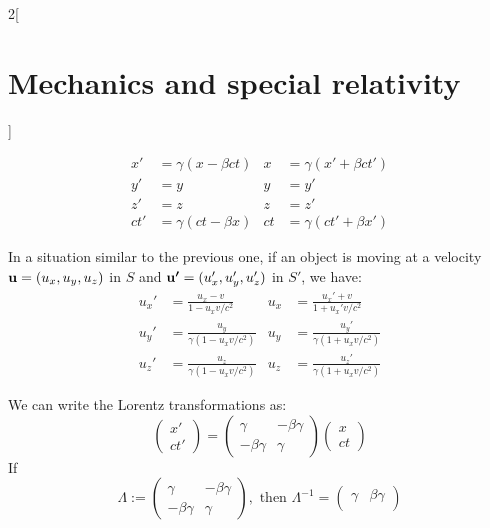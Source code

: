 \documentclass[../../../main.tex]{subfiles}
\begin{document}
\begin{multicols}{2}[\section{Mechanics and special relativity}]
\begin{prop}
\begin{align*}
            x'  & =\gamma(x-\beta ct) & x  & =\gamma(x'+\beta ct') \\
            y'  & =y                  & y  & =y'                   \\
            z'  & =z                  & z  & =z'                   \\
            ct' & =\gamma(ct-\beta x) & ct & =\gamma(ct'+\beta x')
        \end{align*}
    \end{prop}
    \begin{prop}
        In a situation similar to the previous one, if an object is moving at a velocity $\vectorfunction{u}=(u_x,u_y,u_z)$ in $S$ and $\vectorfunction{u'}=(u_x',u_y',u_z')$ in $S'$, we have:
        \begin{align*}
            u_x' & =\frac{u_x-v}{1-u_xv/c^2}                   & u_x & =\frac{u_x'+v}{1+u_x'v/c^2}                  \\
            u_y' & =\frac{u_y}{\gamma \left(1-u_xv/c^2\right)} & u_y & =\frac{u_y'}{\gamma \left(1+u_xv/c^2\right)} \\
            u_z' & =\frac{u_z}{\gamma \left(1-u_xv/c^2\right)} & u_z & =\frac{u_z'}{\gamma \left(1+u_xv/c^2\right)}
        \end{align*}
    \end{prop}
    \begin{prop}
        We can write the Lorentz transformations as:
        $$\begin{pmatrix}
                x' \\
                ct'
            \end{pmatrix}=\begin{pmatrix}
                \gamma       & -\beta\gamma \\
                -\beta\gamma & \gamma
            \end{pmatrix}\begin{pmatrix}
                x \\
                ct
            \end{pmatrix}$$ If $$\Lambda:=\begin{pmatrix}
                \gamma       & -\beta\gamma \\
                -\beta\gamma & \gamma
            \end{pmatrix},\text{ then }\Lambda^{-1}=\begin{pmatrix}
                \gamma      & \beta\gamma \\

\end{pmatrix}$$
\end{prop}
\end{multicols}
\end{document}
